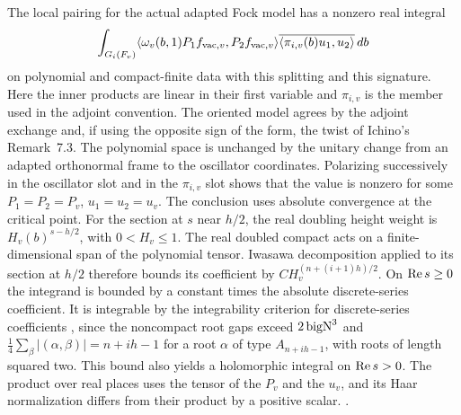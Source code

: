 The local pairing for the actual adapted Fock model has a nonzero real integral \cite[Proposition~7.1 and Remark~7.2]{p2ichino-real-theta}
\[
 \int_{G_i(F_v)}
    \langle\omega_v(b,1) P_1 f_{{\rm vac},v},P_2 f_{{\rm vac},v}\rangle
    \overline{\langle\pi_{i,v}(b)u_1,u_2\rangle}\,db
\]
on polynomial and compact-finite data with this splitting and this
signature. Here the inner products are linear in their first
variable and \(\pi_{i,v}\) is the member used in the adjoint
convention. The oriented model agrees by the adjoint exchange
and, if using the opposite sign of the form, the twist of
Ichino's Remark~7.3. The polynomial space is unchanged by the
unitary change from an adapted orthonormal frame to the oscillator
coordinates. Polarizing successively in the oscillator slot and
in the \(\pi_{i,v}\) slot shows that the value is nonzero for
some \(P_1=P_2=P_v\), \(u_1=u_2=u_v\). The conclusion uses
absolute convergence at the critical point. For the section
at \(s\) near \(h/2\), the real doubling height weight is
\(H_v(b)^{s-h/2}\), with \(0<H_v\le1\). The real doubled
compact acts on a finite-dimensional span of the polynomial
tensor. Iwasawa decomposition applied to its section at \(h/2\)
therefore bounds its coefficient by \(C H_v^{(n+(i+1)h)/2}\).
On \({\rm Re}\,s\ge0\) the integrand is bounded by a constant
times the absolute discrete-series coefficient. It is integrable
by the integrability criterion for discrete-series coefficients \cite[Part~III, \S3, Corollary to Theorem~1]{p2milicic-integrability},
since the noncompact
root gaps exceed \(2\,{\rm bigN}^3\) and
\(\tfrac14\sum_\beta|(\alpha,\beta)|=n+ih-1\)
for a root \(\alpha\) of type \(A_{n+ih-1}\), with roots of
length squared two. This bound also yields a holomorphic integral
on \({\rm Re}\,s>0\). The product over real places uses the tensor
of the \(P_v\) and the \(u_v\), and its Haar normalization differs
from their product by a positive scalar.
.

